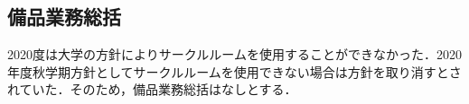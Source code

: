 \subsection*{備品業務総括}

2020度は大学の方針によりサークルルームを使用することができなかった．2020年度秋学期方針としてサークルルームを使用できない場合は方針を取り消すとされていた．そのため，備品業務総括はなしとする．
